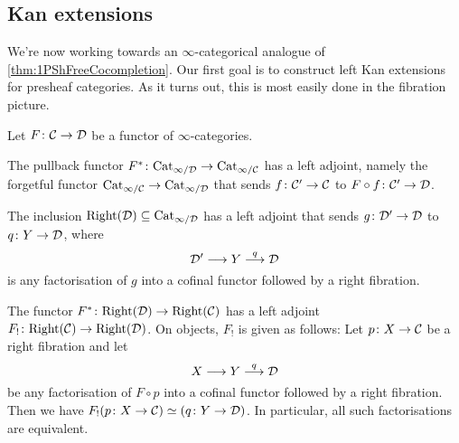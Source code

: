 \subsection{Kan extensions}\label{subsec:KanExtensions}
We're now working towards an $\infty$-categorical analogue of \cref{thm:1PShFreeCocompletion}. %
Our first goal is to construct left Kan extensions for presheaf categories. As it turns out, this is most easily done in the fibration picture.
\begin{lem}\label{lem:KanExtensionForRight}
	Let $F\colon \mathcal{C}\rightarrow \mathcal{D}$ be a functor of $\infty$-categories.
	\begin{alphanumerate}
		\item \!The pullback functor $F^*\colon \mathrm{Cat}_{\infty/\mathcal{D}}\rightarrow\mathrm{Cat}_{\infty/\mathcal{C}}$ has a left adjoint, namely the forgetful functor $\mathrm{Cat}_{\infty/\mathcal{C}}\rightarrow\mathrm{Cat}_{\infty/\mathcal{D}}$ that sends $f\colon \mathcal{C}'\rightarrow \mathcal{C}$ to $F\circ f\colon \mathcal{C}'\rightarrow \mathcal{D}$.\label{enum:ForgetfulFunctor}
		\item \!The inclusion $\mathrm{Right}(\mathcal{D})\subseteq\mathrm{Cat}_{\infty/\mathcal{D}}$ has a left adjoint that sends $g\colon \mathcal{D}'\rightarrow \mathcal{D}$ to $q\colon Y\rightarrow \mathcal{D}$, where
		\begin{equation*}
			\mathcal{D}'\longrightarrow Y\overset{q}{\longrightarrow}\mathcal{D}
		\end{equation*}
		is any factorisation of $g$ into a cofinal functor followed by a right fibration.\label{enum:RightCofinalLeftAdjoint}
		\item \!The functor $F^*\colon \mathrm{Right}(\mathcal{D})\rightarrow \mathrm{Right}(\mathcal{C})$ has a left adjoint $F_!\colon \mathrm{Right}(\mathcal{C})\rightarrow \mathrm{Right}(\mathcal{D})$. On objects, $F_!$ is given as follows: Let $p\colon X\rightarrow \mathcal{C}$ be a right fibration and let\label{enum:RightPullbackLeftAdjoint}
		\begin{equation*}
			X\longrightarrow Y\overset{q}{\longrightarrow} \mathcal{D}
		\end{equation*}
		be any factorisation of $F\circ p$ into a cofinal functor followed by a right fibration. Then we have $F_!(p\colon X\rightarrow \mathcal{C})\simeq (q\colon Y\rightarrow \mathcal{D})$. In particular, all such factorisations are equivalent.
	\end{alphanumerate}
\end{lem}
